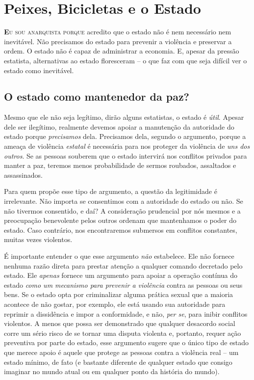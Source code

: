 
\chapter{Peixes, Bicicletas e o Estado}
\label{chap:2}

\lettrine[lines=2]{\textcolor{LettrineColor}{\textbf{E}}}{u sou anarquista porque} acredito que o estado não é nem necessário nem inevitável. Não precisamos do estado para prevenir a violência e preservar a ordem. O estado não é capaz de administrar a economia. E, apesar da pressão estatista, alternativas ao estado floresceram -- o que faz com que seja difícil ver o estado como inevitável.

\section{O estado como mantenedor da paz?}

Mesmo que ele não seja legítimo, dirão alguns estatistas, o estado é \emph{útil}. Apesar dele ser ilegítimo, realmente devemos apoiar a manutenção da autoridade do estado porque \emph{precisamos} dela. Precisamos dela, segundo o argumento, porque a ameaça de violência \emph{estatal} é necessária para nos proteger da violência de \emph{uns dos outros}. Se as pessoas souberem que o estado intervirá nos conflitos privados para manter a paz, teremos menos probabilidade de sermos roubados, assaltados e assassinados.

Para quem propõe esse tipo de argumento, a questão da legitimidade é irrelevante. Não importa se consentimos com a autoridade do estado ou não. Se não tivermos consentido, e daí? A consideração prudencial por nós mesmos e a preocupação benevolente pelos outros ordenam que mantenhamos o poder do estado. Caso contrário, nos encontraremos submersos em conflitos constantes, muitas vezes violentos.

É importante entender o que esse argumento \emph{não} estabelece. Ele não fornece nenhuma razão direta para prestar atenção a qualquer comando decretado pelo estado. Ele \emph{apenas} fornece um argumento para apoiar a operação contínua do estado \emph{como um mecanismo para prevenir a violência} contra as pessoas ou seus bens. Se o estado opta por criminalizar alguma prática sexual que a maioria acontece de não gostar, por exemplo, ele está usando sua autoridade para reprimir a dissidência e impor a conformidade, e não, \emph{per se}, para inibir conflitos violentos. A menos que possa ser demonstrado que qualquer desacordo social corre um sério risco de se tornar uma disputa violenta e, portanto, requer ação preventiva por parte do estado, esse argumento sugere que o único tipo de estado que merece apoio é aquele que protege as pessoas contra a violência real -- um estado mínimo, de fato (e bastante diferente de qualquer estado que consigo imaginar no mundo atual ou em qualquer ponto da história do mundo).

